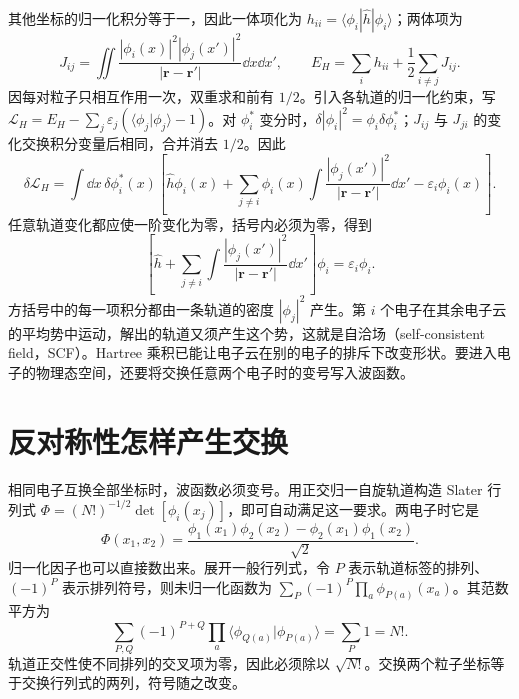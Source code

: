 其他坐标的归一化积分等于一，因此一体项化为 $h_{ii}=\langle\phi_i|\hat h|\phi_i\rangle$；两体项为
\begin{equation}
J_{ij}=\iint\frac{|\phi_i(x)|^2|\phi_j(x')|^2}{|\bm r-\bm r'|}\dd x\dd x',\qquad
E_H=\sum_i h_{ii}+\frac12\sum_{i\ne j}J_{ij}.
\end{equation}
因每对粒子只相互作用一次，双重求和前有 $1/2$。引入各轨道的归一化约束，写 $\mathcal L_H=E_H-\sum_j\varepsilon_j(\langle\phi_j|\phi_j\rangle-1)$。对 $\phi_i^*$ 变分时，$\delta|\phi_i|^2=\phi_i\delta\phi_i^*$；$J_{ij}$ 与 $J_{ji}$ 的变化交换积分变量后相同，合并消去 $1/2$。因此
\begin{equation}
\delta\mathcal L_H=\int\dd x\,\delta\phi_i^*(x)
\left[\hat h\phi_i(x)+\sum_{j\ne i}\phi_i(x)
\int\frac{|\phi_j(x')|^2}{|\bm r-\bm r'|}\dd x'-\varepsilon_i\phi_i(x)\right].
\end{equation}
任意轨道变化都应使一阶变化为零，括号内必须为零，得到
\begin{equation}
\left[\hat h+\sum_{j\ne i}\int\frac{|\phi_j(x')|^2}{|\bm r-\bm r'|}\dd x'\right]\phi_i=\varepsilon_i\phi_i.
\end{equation}
方括号中的每一项积分都由一条轨道的密度 $|\phi_j|^2$ 产生。第 $i$ 个电子在其余电子云的平均势中运动，解出的轨道又须产生这个势，这就是自洽场（self-consistent field，SCF）。Hartree 乘积已能让电子云在别的电子的排斥下改变形状。要进入电子的物理态空间，还要将交换任意两个电子时的变号写入波函数。

\section{反对称性怎样产生交换}\label{hf:exchange}
相同电子互换全部坐标时，波函数必须变号。用正交归一自旋轨道构造 Slater 行列式 $\Phi=(N!)^{-1/2}\det[\phi_i(x_j)]$，即可自动满足这一要求。两电子时它是
\begin{equation}
\Phi(x_1,x_2)=\frac{\phi_1(x_1)\phi_2(x_2)-\phi_2(x_1)\phi_1(x_2)}{\sqrt2}.
\end{equation}
归一化因子也可以直接数出来。展开一般行列式，令 $P$ 表示轨道标签的排列、$(-1)^P$ 表示排列符号，则未归一化函数为 $\sum_P(-1)^P\prod_a\phi_{P(a)}(x_a)$。其范数平方为
\begin{equation}
\sum_{P,Q}(-1)^{P+Q}\prod_a
\langle\phi_{Q(a)}|\phi_{P(a)}\rangle
=\sum_P1=N!.
\end{equation}
轨道正交性使不同排列的交叉项为零，因此必须除以 $\sqrt{N!}$。交换两个粒子坐标等于交换行列式的两列，符号随之改变。

